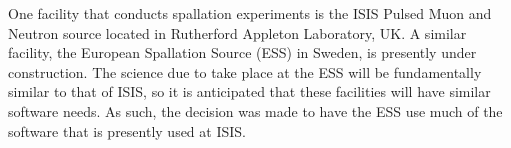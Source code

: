 One facility that conducts spallation experiments is the ISIS Pulsed Muon and Neutron source located in Rutherford Appleton Laboratory, UK. A similar facility, the European Spallation Source (ESS) in Sweden, is presently under construction. The science due to take place at the ESS will be fundamentally similar to that of ISIS, so it is anticipated that these facilities will have similar software needs. As such, the decision was made to have the ESS use much of the software that is presently used at ISIS.
